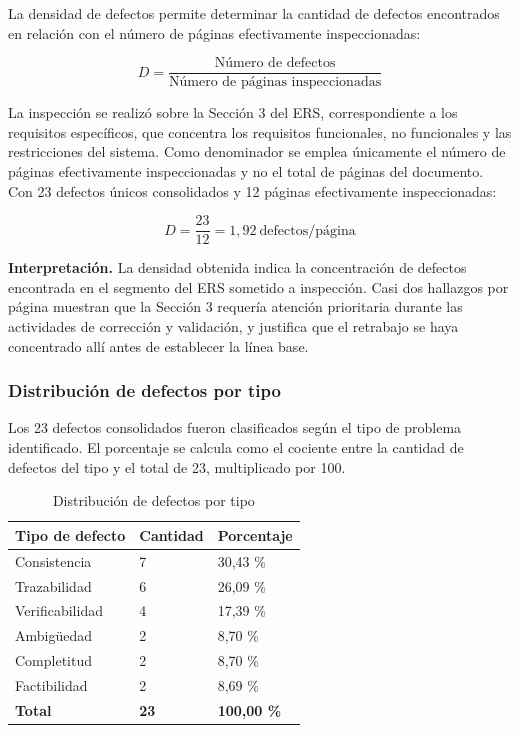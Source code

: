 \documentclass[journal,onecolumn]{IEEEtran}
\begin{document}
	La densidad de defectos permite determinar la cantidad de defectos encontrados en relación con el
	número de páginas efectivamente inspeccionadas:
	
	\begin{equation}
		D = \frac{\text{Número de defectos}}{\text{Número de páginas inspeccionadas}}
		\label{eq:densidad}
	\end{equation}
	
	La inspección se realizó sobre la Sección 3 del ERS, correspondiente a los requisitos específicos,
	que concentra los requisitos funcionales, no funcionales y las restricciones del sistema. Como
	denominador se emplea únicamente el número de páginas efectivamente inspeccionadas y no el total
	de páginas del documento. Con 23 defectos únicos consolidados y 12 páginas efectivamente
	inspeccionadas:
	
	\begin{equation*}
		D = \frac{23}{12} = 1{,}92~\text{defectos/página}
	\end{equation*}
	
	\textbf{Interpretación.} La densidad obtenida indica la concentración de defectos encontrada en el
	segmento del ERS sometido a inspección. Casi dos hallazgos por página muestran que la Sección 3
	requería atención prioritaria durante las actividades de corrección y validación, y justifica que
	el retrabajo se haya concentrado allí antes de establecer la línea base.
	
	\subsubsection{Distribución de defectos por tipo}
	
	Los 23 defectos consolidados fueron clasificados según el tipo de problema identificado. El
	porcentaje se calcula como el cociente entre la cantidad de defectos del tipo y el total de 23,
	multiplicado por 100.
	
	\begin{table}[H]
		\centering
		\caption{Distribución de defectos por tipo}
		\label{tab:dist-tipo}
		\begin{tabular}{L{4.0cm} C{2.4cm} C{2.4cm}}
			\toprule
			\textbf{Tipo de defecto} & \textbf{Cantidad} & \textbf{Porcentaje} \\
			\midrule
			Consistencia    & 7  & 30,43 \% \\
			Trazabilidad    & 6  & 26,09 \% \\
			Verificabilidad & 4  & 17,39 \% \\
			Ambigüedad      & 2  & 8,70 \% \\
			Completitud     & 2  & 8,70 \% \\
			Factibilidad    & 2  & 8,69 \% \\
			\midrule
			\textbf{Total}  & \textbf{23} & \textbf{100,00 \%} \\
			\bottomrule
		\end{tabular}
	\end{table}
	
\end{document}
